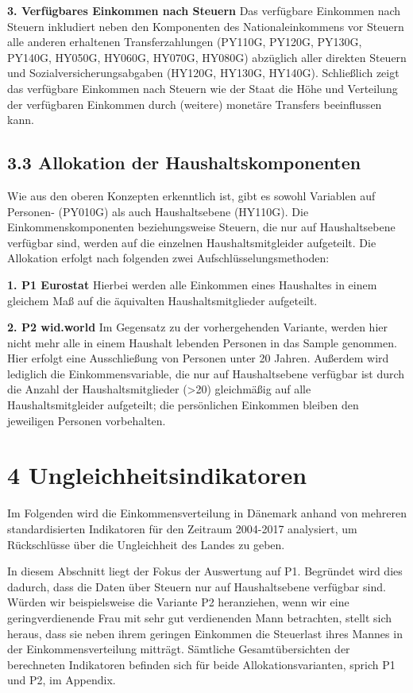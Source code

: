 \documentclass[ngerman,]{article}
\begin{document}
\textbf{3. Verfügbares Einkommen nach Steuern} Das verfügbare Einkommen
nach Steuern inkludiert neben den Komponenten des Nationaleinkommens vor
Steuern alle anderen erhaltenen Transferzahlungen (PY110G, PY120G,
PY130G, PY140G, HY050G, HY060G, HY070G, HY080G) abzüglich aller direkten
Steuern und Sozialversicherungsabgaben (HY120G, HY130G, HY140G).
Schließlich zeigt das verfügbare Einkommen nach Steuern wie der Staat
die Höhe und Verteilung der verfügbaren Einkommen durch (weitere)
monetäre Transfers beeinflussen kann.

\subsection{3.3 Allokation der
Haushaltskomponenten}\label{allokation-der-haushaltskomponenten}

Wie aus den oberen Konzepten erkenntlich ist, gibt es sowohl Variablen
auf Personen- (PY010G) als auch Haushaltsebene (HY110G). Die
Einkommenskomponenten beziehungsweise Steuern, die nur auf
Haushaltsebene verfügbar sind, werden auf die einzelnen
Haushaltsmitgleider aufgeteilt. Die Allokation erfolgt nach folgenden
zwei Aufschlüsselungsmethoden:

\textbf{1. P1 Eurostat } Hierbei werden alle Einkommen eines Haushaltes
in einem gleichem Maß auf die äquivalten Haushaltsmitglieder aufgeteilt.

\textbf{2. P2 wid.world } Im Gegensatz zu der vorhergehenden Variante,
werden hier nicht mehr alle in einem Haushalt lebenden Personen in das
Sample genommen. Hier erfolgt eine Ausschließung von Personen unter 20
Jahren. Außerdem wird lediglich die Einkommensvariable, die nur auf
Haushaltsebene verfügbar ist durch die Anzahl der Haushaltsmitglieder
(\textgreater{}20) gleichmäßig auf alle Haushaltsmitgleider aufgeteilt;
die persönlichen Einkommen bleiben den jeweiligen Personen vorbehalten.

\section{4 Ungleichheitsindikatoren}\label{ungleichheitsindikatoren}

Im Folgenden wird die Einkommensverteilung in Dänemark anhand von
mehreren standardisierten Indikatoren für den Zeitraum 2004-2017
analysiert, um Rückschlüsse über die Ungleichheit des Landes zu geben.

In diesem Abschnitt liegt der Fokus der Auswertung auf P1. Begründet
wird dies dadurch, dass die Daten über Steuern nur auf Haushaltsebene
verfügbar sind. Würden wir beispielsweise die Variante P2 heranziehen,
wenn wir eine geringverdienende Frau mit sehr gut verdienenden Mann
betrachten, stellt sich heraus, dass sie neben ihrem geringen Einkommen
die Steuerlast ihres Mannes in der Einkommensverteilung mitträgt.
Sämtliche Gesamtübersichten der berechneten Indikatoren befinden sich
für beide Allokationsvarianten, sprich P1 und P2, im Appendix.
\end{document}
